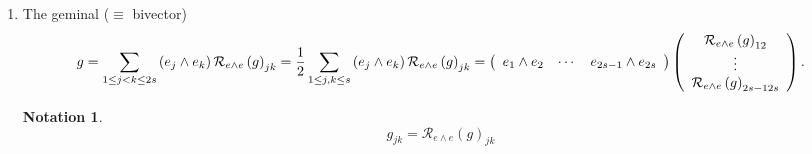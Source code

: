 \documentclass[aps,preprint]{revtex4}%
\newtheorem{notation}[theorem]{Notation}
\begin{document}
\begin{enumerate}
\item The geminal ($\equiv$ bivector)
\begin{equation}
g=\sum_{1\leq j<k\leq2s}\left(  e_{j}\wedge e_{k}\right)  \mathcal{R}_{e\wedge
e}\left(  g\right)  _{jk}=\frac{1}{2}\sum_{1\leq j,k\leq s}\left(  e_{j}\wedge
e_{k}\right)  \mathcal{R}_{e\wedge e}\left(  g\right)  _{jk}=\left(
\begin{array}
[c]{ccc}%
e_{1}\wedge e_{2} & \cdots & e_{2s-1}\wedge e_{2s}%
\end{array}
\right)  \left(
\begin{array}
[c]{c}%
\mathcal{R}_{e\wedge e}\left(  g\right)  _{12}\\
\vdots\\
\mathcal{R}_{e\wedge e}\left(  g\right)  _{2s-12s}%
\end{array}
\right)  .
\end{equation}


\begin{notation}%
\begin{equation}
g_{jk}=\mathcal{R}_{e\wedge e}\left(  g\right)  _{jk}%
\end{equation}

\end{notation}


\end{enumerate}
\end{document}
